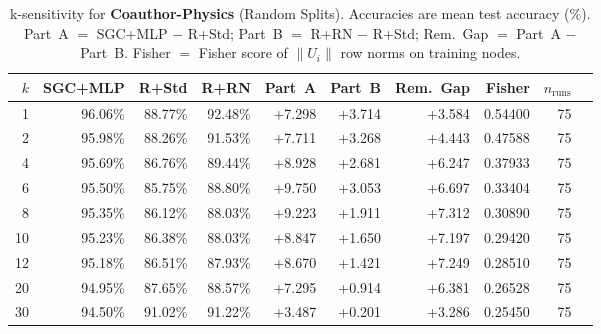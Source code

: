 \begin{table}[t]
\centering\small\setlength{\tabcolsep}{5pt}
\caption{k-sensitivity for \textbf{Coauthor-Physics} (Random Splits). Accuracies are mean test accuracy (\%). Part~A $=$ SGC+MLP $-$ R+Std; Part~B $=$ R+RN $-$ R+Std; Rem.~Gap $=$ Part~A $-$ Part~B. Fisher $=$ Fisher score of $\|U_i\|$ row norms on training nodes.}
\label{tab:exp8_per_dataset_coauthor-physics_random}
\begin{tabular}{rrrrrrrrrr}
\toprule
$k$ & SGC+MLP & R+Std & R+RN & Part~A & Part~B & Rem.~Gap & Fisher & $n_{\mathrm{runs}}$ \\
\midrule
1 & 96.06\% & 88.77\% & 92.48\% & +7.298 & +3.714 & +3.584 & 0.54400 & 75 \\
2 & 95.98\% & 88.26\% & 91.53\% & +7.711 & +3.268 & +4.443 & 0.47588 & 75 \\
4 & 95.69\% & 86.76\% & 89.44\% & +8.928 & +2.681 & +6.247 & 0.37933 & 75 \\
6 & 95.50\% & 85.75\% & 88.80\% & +9.750 & +3.053 & +6.697 & 0.33404 & 75 \\
8 & 95.35\% & 86.12\% & 88.03\% & +9.223 & +1.911 & +7.312 & 0.30890 & 75 \\
10 & 95.23\% & 86.38\% & 88.03\% & +8.847 & +1.650 & +7.197 & 0.29420 & 75 \\
12 & 95.18\% & 86.51\% & 87.93\% & +8.670 & +1.421 & +7.249 & 0.28510 & 75 \\
20 & 94.95\% & 87.65\% & 88.57\% & +7.295 & +0.914 & +6.381 & 0.26528 & 75 \\
30 & 94.50\% & 91.02\% & 91.22\% & +3.487 & +0.201 & +3.286 & 0.25450 & 75 \\
\bottomrule
\end{tabular}
\end{table}
